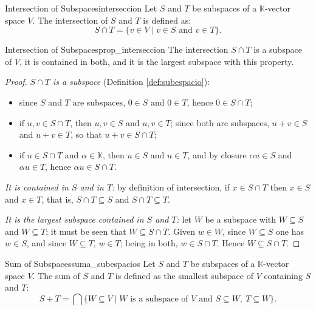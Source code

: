 \documentclass[11pt, a4paper]{article}
\begin{document}
\begin{definicion}{Intersection of Subspaces}{interseccion}
Let $S$ and $T$ be subspaces of a $\mathbb{K}$-vector space $V$. The intersection of $S$ and $T$ is defined as:
\[
S \cap T = \{ v \in V \mid v \in S \text{ and } v \in T \}.
\]
\end{definicion}

\begin{proposicion}{Intersection of Subspaces}{prop_interseccion}
The intersection $S \cap T$ is a subspace of $V$, it is contained in both, and it is the largest subspace with this property.
\end{proposicion}

\begin{proof}
\textit{$S \cap T$ is a subspace} (Definition \ref{def:subespacio}):
\begin{itemize}
    \item since $S$ and $T$ are subspaces, $0 \in S$ and $0 \in T$, hence $0 \in S \cap T$;
    \item if $u, v \in S \cap T$, then $u, v \in S$ and $u, v \in T$; since both are subspaces, $u+v \in S$ and $u+v \in T$, so that $u+v \in S \cap T$;
    \item if $u \in S \cap T$ and $\alpha \in \mathbb{K}$, then $u \in S$ and $u \in T$, and by closure $\alpha u \in S$ and $\alpha u \in T$, hence $\alpha u \in S \cap T$.
\end{itemize}

\textit{It is contained in $S$ and in $T$:} by definition of intersection, if $x \in S \cap T$ then $x \in S$ and $x \in T$, that is, $S \cap T \subseteq S$ and $S \cap T \subseteq T$.

\textit{It is the largest subspace contained in $S$ and $T$:} let $W$ be a subspace with $W \subseteq S$ and $W \subseteq T$; it must be seen that $W \subseteq S \cap T$. Given $w \in W$, since $W \subseteq S$ one has $w \in S$, and since $W \subseteq T$, $w \in T$; being in both, $w \in S \cap T$. Hence $W \subseteq S \cap T$.
\end{proof}

\begin{definicion}{Sum of Subspaces}{suma_subespacios}
Let $S$ and $T$ be subspaces of a $\mathbb{K}$-vector space $V$. The sum of $S$ and $T$ is defined as the smallest subspace of $V$ containing $S$ and $T$:
\[
S + T = \bigcap \{ W \subseteq V \mid W \text{ is a subspace of $V$ and } S \subseteq W, \ T \subseteq W \}.
\]
\end{definicion}
\end{document}
